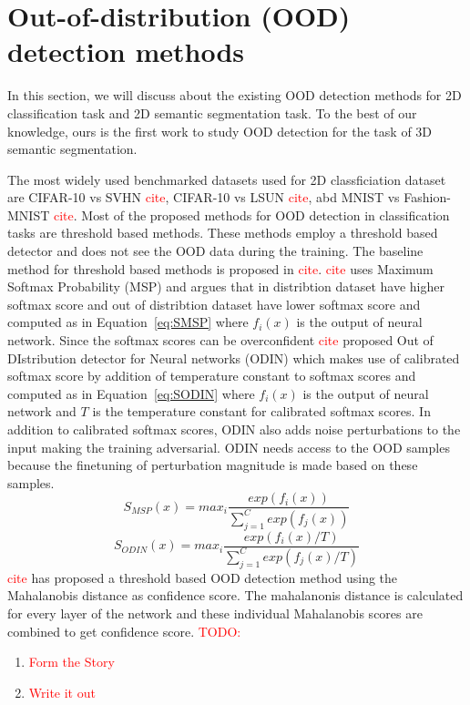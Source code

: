     
    
    \section{Out-of-distribution (OOD) detection methods}
    In this section, we will discuss about the existing OOD detection methods for 2D classification task and 2D semantic segmentation task.
    To the best of our knowledge, ours is the first work to study OOD detection for the task of 3D semantic segmentation.

    The most widely used benchmarked datasets used for 2D classficiation dataset are CIFAR-10 vs SVHN \textcolor{red}{cite}, CIFAR-10 vs LSUN \textcolor{red}{cite}, abd MNIST vs Fashion-MNIST \textcolor{red}{cite}. 
    Most of the proposed methods for OOD detection in classification tasks are threshold based methods.
    These methods employ a threshold based detector and does not see the OOD data during the training.
    The baseline method for threshold based methods is proposed in \textcolor{red}{cite}.
    \textcolor{red}{cite} uses Maximum Softmax Probability (MSP) and argues that in distribtion dataset have higher softmax score and out of distribtion dataset have lower softmax score and computed as in Equation~\ref{eq:SMSP} where $f_i(x)$ is the output of neural network.
    Since the softmax scores can be overconfident \textcolor{red}{cite} proposed Out of DIstribution detector for Neural networks (ODIN) which makes use of calibrated softmax score by addition of temperature constant to softmax scores and computed as in Equation~\ref{eq:SODIN} where $f_i(x)$ is the output of neural network and $T$ is the temperature constant for calibrated softmax scores.
    In addition to calibrated softmax scores, ODIN also adds noise perturbations to the input making the training adversarial.
    ODIN needs access to the OOD samples because the finetuning of perturbation magnitude is made based on these samples.
    \begin{equation}
        S_{MSP}(x) = max_i \frac{exp(f_i(x))}{\sum^{C}_{j=1}exp(f_j(x))}  \label{eq:SMSP}
    \end{equation}
    \begin{equation}
        S_{ODIN}(x) = max_i \frac{exp(f_i(x)/T)}{\sum^{C}_{j=1}exp(f_j(x)/T)}  \label{eq:SODIN}
    \end{equation}
    \textcolor{red}{cite} has proposed a threshold based OOD detection method using the Mahalanobis distance as confidence score.
    The mahalanonis distance is calculated for every layer of the network and these individual Mahalanobis scores are combined to get confidence score.
    \textcolor{red}{TODO:}
    \begin{enumerate}
        \item \textcolor{red}{Form the Story}
        \item \textcolor{red}{Write it out}
    \end{enumerate}

